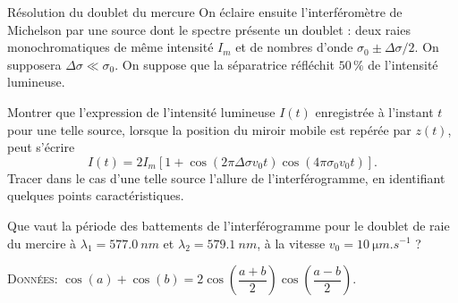 \begin{exo}[PC][1][colle]{Résolution du doublet du mercure}
	On éclaire ensuite l'interféromètre de Michelson par une source dont le spectre présente un doublet : deux raies monochromatiques de même intensité $I_m$ et de nombres d'onde $\sigma_0 \pm \Delta \sigma/2$. On supposera $\Delta \sigma \ll \sigma_0$. On suppose que la séparatrice réfléchit $50\,\%$ de l'intensité lumineuse.

	\begin{quest}

	\item Montrer que l'expression de l'intensité lumineuse $I(t)$ enregistrée à l'instant $t$ pour une telle source, lorsque la position du miroir mobile est repérée
par $z(t)$, peut s'écrire
\begin{equation}
I(t) = 2 I_m [1 + \cos(2\pi \Delta \sigma v_0 t)\cos(4\pi \sigma_0 v_0 t)].
\end{equation}
Tracer dans le cas d'une telle source l'allure de l'interférogramme, en identifiant quelques points caractéristiques.
\item Que vaut la période des battements de l'interférogramme pour le doublet de raie du mercire à  $\lambda_1 = \SI{577.0}{nm}$ et $\lambda_2=\SI{579.1}{nm}$, à la vitesse $v_0 = \SI{10}{\micro m.s^{-1}}$ ?

\end{quest}


\textsc{Données:} $\cos(a) + \cos(b) = 2\cos\left(\dfrac{a+b}{2}\right)\cos\left(\dfrac{a-b}{2}\right)$.


\end{exo}

